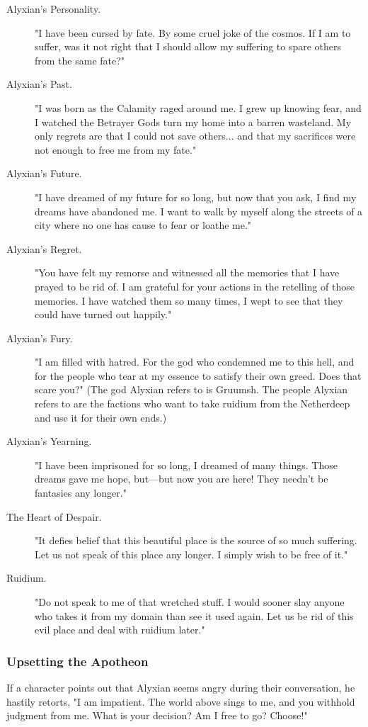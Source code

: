 \documentclass[10pt,a4paper,twoside,bg=print,twocolumn,openany,nodeprecatedcode]{dndbook}
\begin{document}
\begin{description}
\item[Alyxian's Personality.]
"I have been cursed by fate. By some cruel joke of the cosmos. If I am to suffer, was it not right that I should allow my suffering to spare others from the same fate?"
\item[Alyxian's Past.]
"I was born as the Calamity raged around me. I grew up knowing fear, and I watched the Betrayer Gods turn my home into a barren wasteland. My only regrets are that I could not save others... and that my sacrifices were not enough to free me from my fate."
\item[Alyxian's Future.]
"I have dreamed of my future for so long, but now that you ask, I find my dreams have abandoned me. I want to walk by myself along the streets of a city where no one has cause to fear or loathe me."
\item[Alyxian's Regret.]
"You have felt my remorse and witnessed all the memories that I have prayed to be rid of. I am grateful for your actions in the retelling of those memories. I have watched them so many times, I wept to see that they could have turned out happily."
\item[Alyxian's Fury.]
"I am filled with hatred. For the god who condemned me to this hell, and for the people who tear at my essence to satisfy their own greed. Does that scare you?" (The god Alyxian refers to is Gruumsh. The people Alyxian refers to are the factions who want to take ruidium from the Netherdeep and use it for their own ends.)
\item[Alyxian's Yearning.]
"I have been imprisoned for so long, I dreamed of many things. Those dreams gave me hope, but—but now you are here! They needn't be fantasies any longer."
\item[The Heart of Despair.]
"It defies belief that this beautiful place is the source of so much suffering. Let us not speak of this place any longer. I simply wish to be free of it."
\item[Ruidium.]
"Do not speak to me of that wretched stuff. I would sooner slay anyone who takes it from my domain than see it used again. Let us be rid of this evil place and deal with ruidium later."
\end{description}

\subsubsection{Upsetting the Apotheon}
If a character points out that Alyxian seems angry during their conversation, he hastily retorts, "I am impatient. The world above sings to me, and you withhold judgment from me. What is your decision? Am I free to go? Choose!"
\end{document}
